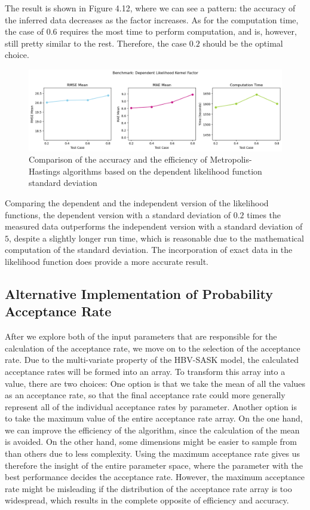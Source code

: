 The result is shown in Figure 4.12, where we can see a pattern: the accuracy of the inferred data decreases as the factor increases. As for the computation time, the case of $0.6$ requires the most time to perform computation, and is, however, still pretty similar to the rest. Therefore, the case $0.2$ should be the optimal choice.

\begin{figure}[H]
    \centering
    \includegraphics[width=1\textwidth]{figures/basic_mh/benchmark/sensitivity_likelihood_dependent.png}
    \captionsetup{width=.8\textwidth}
    \caption{Comparison of the accuracy and the efficiency of Metropolis-Hastings algorithms based on the dependent likelihood function standard deviation}
    \label{fig:enter-label}
\end{figure}


Comparing the dependent and the independent version of the likelihood functions, the dependent version with a standard deviation of $0.2$ times the measured data outperforms the independent version with a standard deviation of $5$, despite a slightly longer run time, which is reasonable due to the mathematical computation of the standard deviation. The incorporation of exact data in the likelihood function does provide a more accurate result.

\subsection{Alternative Implementation of Probability Acceptance Rate}
After we explore both of the input parameters that are responsible for the calculation of the acceptance rate, we move on to the selection of the acceptance rate. Due to the multi-variate property of the HBV-SASK model, the calculated acceptance rates will be formed into an array. To transform this array into a value, there are two choices: One option is that we take the mean of all the values as an acceptance rate, so that the final acceptance rate could more generally represent all of the individual acceptance rates by parameter. Another option is to take the maximum value of the entire acceptance rate array. On the one hand, we can improve the efficiency of the algorithm, since the calculation of the mean is avoided. On the other hand, some dimensions might be easier to sample from than others due to less complexity. Using the maximum acceptance rate gives us therefore the insight of the entire parameter space, where the parameter with the best performance decides the acceptance rate. However, the maximum acceptance rate might be misleading if the distribution of the acceptance rate array is too widespread, which results in the complete opposite of efficiency and accuracy.

